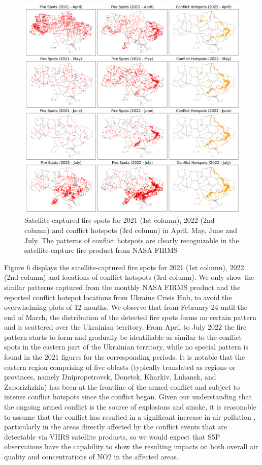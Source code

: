 \begin{figure}[p]
    \centering
    \includegraphics[width=\textwidth]{figs/chap3/fig6.png}
    \caption{Satellite-captured fire spots for 2021 (1st column), 2022 (2nd column) and conflict hotspots (3rd column) in April, May, June and July. The patterns of conflict hotspots are clearly recognizable in the satellite-capture fire product from NASA FIRMS}
    \label{fig:fig6}
\end{figure}

Figure 6 displays the satellite-captured fire spots for 2021 (1st column), 2022 (2nd column) and locations of conflict hotspots (3rd column). We only show the similar patterns captured from the monthly NASA FIRMS product and the reported conflict hotspot locations from Ukraine Crisis Hub, to avoid the overwhelming plots of 12 months. We observe that from February 24 until the end of March, the distribution of the detected fire spots forms no certain pattern and is scattered over the Ukrainian territory. From April to July 2022 the fire pattern starts to form and gradually be identifiable as similar to the conflict spots in the eastern part of the Ukrainian territory, while no special pattern is found in the 2021 figures for the corresponding periods. It is notable that the eastern region comprising of five oblasts (typically translated as regions or provinces, namely Dnipropetrovsk, Donetsk, Kharkiv, Luhansk, and Zaporizhzhia) has been at the frontline of the armed conflict and subject to intense conflict hotspots since the conflict began. Given our understanding that the ongoing armed conflict is the source of explosions and smoke, it is reasonable to assume that the conflict has resulted in a significant increase in air pollution \citep{pereira2022russian}, particularly in the areas directly affected by the conflict events that are detectable via VIIRS satellite products, so we would expect that S5P observations have the capability to show the resulting impacts on both overall air quality and concentrations of NO2 in the affected areas.\par
